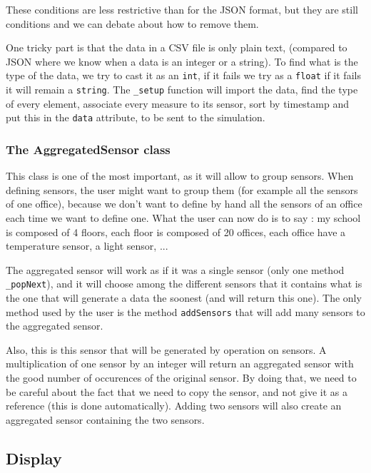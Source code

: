 These conditions are less restrictive than for the JSON format, but they are still conditions and we can debate about how to remove them.

One tricky part is that the data in a CSV file is only plain text, (compared to JSON where we know when a data is an integer or a string). To find what is the type of the data, we try to cast it as an \verb!int!, if it fails we try as a \verb!float! if it fails it will remain a \verb!string!. The \verb!_setup! function will import the data, find the type of every element, associate every measure to its sensor, sort by timestamp and put this in the \verb!data! attribute, to be sent to the simulation.



\subsubsection{The AggregatedSensor class}

This class is one of the most important, as it will allow to group sensors. When defining sensors, the user might want to group them (for example all the sensors of one office), because we don't want to define by hand all the sensors of an office each time we want to define one. What the user can now do is to say : my school is composed of 4 floors, each floor is composed of 20 offices, each office have a temperature sensor, a light sensor, ...

The aggregated sensor will work as if it was a single sensor (only one method \verb!_popNext!), and it will choose among the different sensors that it contains what is the one that will generate a data the soonest (and will return this one). The only method used by the user is the method \verb!addSensors! that will add many sensors to the aggregated sensor.

Also, this is this sensor that will be generated by operation on sensors. A multiplication of one sensor by an integer will return an aggregated sensor with the good number of occurences of the original sensor. By doing that, we need to be careful about the fact that we need to copy the sensor, and not give it as a reference (this is done automatically). Adding two sensors will also create an aggregated sensor containing the two sensors.


\subsection{Display}

